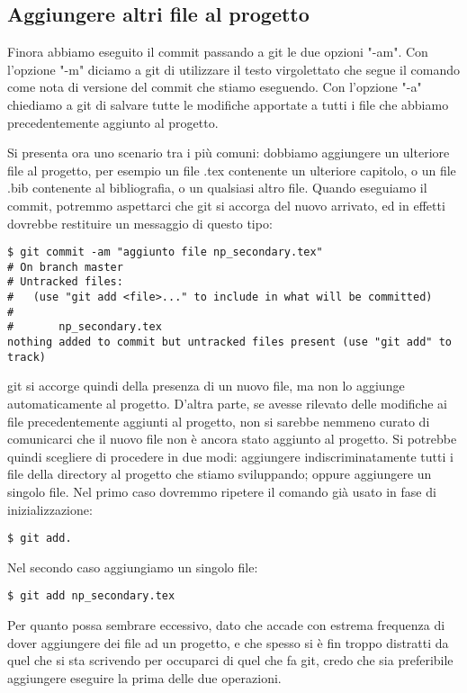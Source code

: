 \documentclass{article}
\begin{document}
\subsection{Aggiungere altri file al progetto}
Finora abbiamo eseguito il commit passando a git le due opzioni "-am".
Con l'opzione "-m" diciamo a git di utilizzare il testo virgolettato che segue
il comando come nota di versione del commit che stiamo eseguendo.
Con l'opzione "-a" chiediamo a git di salvare tutte le modifiche apportate a
tutti i file che abbiamo precedentemente aggiunto al progetto.

Si presenta ora uno scenario tra i più comuni: dobbiamo aggiungere un ulteriore
file al progetto, per esempio un file .tex contenente un ulteriore capitolo, o
un file .bib contenente al bibliografia, o un qualsiasi altro file.
Quando eseguiamo il commit, potremmo aspettarci che git si accorga del nuovo
arrivato, ed in effetti dovrebbe restituire un messaggio di questo tipo:

\begin{lstlisting}
$ git commit -am "aggiunto file np_secondary.tex"
# On branch master
# Untracked files:
#   (use "git add <file>..." to include in what will be committed)
#
#       np_secondary.tex
nothing added to commit but untracked files present (use "git add" to track)
\end{lstlisting}

git si accorge quindi della presenza di un nuovo file, ma non lo aggiunge
automaticamente al progetto. D'altra parte, se avesse rilevato delle modifiche
ai file precedentemente aggiunti al progetto, non si sarebbe nemmeno curato di
comunicarci che il nuovo file non è ancora stato aggiunto al progetto.
Si potrebbe quindi scegliere di procedere in due modi: aggiungere
indiscriminatamente tutti i file della directory al progetto che stiamo
sviluppando; oppure aggiungere un singolo file.
Nel primo caso dovremmo ripetere il comando già usato in fase di
inizializzazione:

\begin{lstlisting}
$ git add.
\end{lstlisting}

Nel secondo caso aggiungiamo un singolo file:

\begin{lstlisting}
$ git add np_secondary.tex
\end{lstlisting}

Per quanto possa sembrare eccessivo, dato che accade con estrema frequenza di
dover aggiungere dei file ad un progetto, e che spesso si è fin troppo
distratti da quel che si sta scrivendo per occuparci di quel che fa git, credo
che sia preferibile aggiungere eseguire la prima delle due operazioni.
\end{document}
